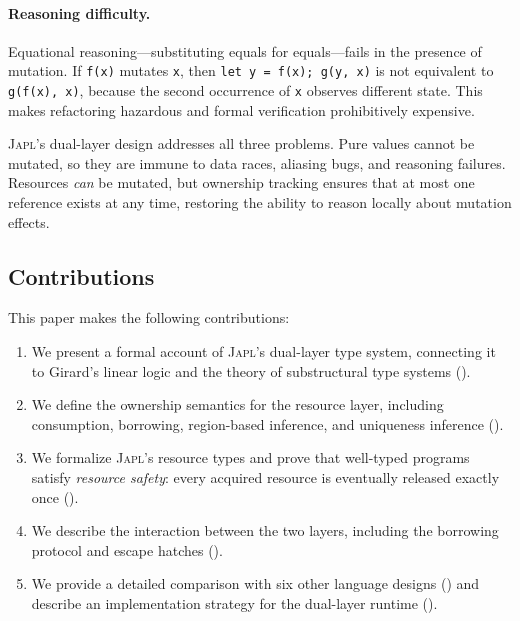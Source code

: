 \documentclass[11pt]{article}
\newcommand{\JAPL}{\textsc{Japl}}
\begin{document}
\paragraph{Reasoning difficulty.}
Equational reasoning---substituting equals for equals---fails in the
presence of mutation.  If \texttt{f(x)} mutates \texttt{x}, then
\texttt{let y = f(x); g(y, x)} is not equivalent to
\texttt{g(f(x), x)}, because the second occurrence of \texttt{x}
observes different state.  This makes refactoring hazardous and
formal verification prohibitively expensive.

\JAPL{}'s dual-layer design addresses all three problems.  Pure values
cannot be mutated, so they are immune to data races, aliasing bugs,
and reasoning failures.  Resources \emph{can} be mutated, but
ownership tracking ensures that at most one reference exists at any
time, restoring the ability to reason locally about mutation effects.

\subsection{Contributions}

This paper makes the following contributions:

\begin{enumerate}
  \item We present a formal account of \JAPL{}'s dual-layer type system,
        connecting it to Girard's linear logic and the theory of
        substructural type systems ().
  \item We define the ownership semantics for the resource layer,
        including consumption, borrowing, region-based inference, and
        uniqueness inference ().
  \item We formalize \JAPL{}'s resource types and prove that well-typed
        programs satisfy \emph{resource safety}: every acquired
        resource is eventually released exactly once ().
  \item We describe the interaction between the two layers, including
        the borrowing protocol and escape hatches ().
  \item We provide a detailed comparison with six other language
        designs () and describe an implementation
        strategy for the dual-layer runtime ().
\end{enumerate}
\end{document}
